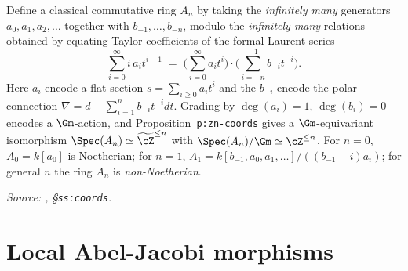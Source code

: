 \begin{definition}
  \label{def:An-coords}
  Define a classical commutative ring $A_n$ by taking the
  \emph{infinitely many} generators $a_0, a_1, a_2, \ldots$ together with
  $b_{-1}, \ldots, b_{-n}$, modulo the \emph{infinitely many} relations
  obtained by equating Taylor coefficients of the formal Laurent series
  \[
    \sum_{i=0}^{\infty} i\,a_i t^{i-1}
    \;=\;
    \Big(\sum_{i=0}^{\infty} a_i t^i\Big)\cdot
    \Big(\sum_{i=-n}^{-1} b_{-i} t^{-i}\Big).
  \]
  Here $a_i$ encode a flat section $s = \sum_{i\geq 0} a_i t^i$ and the
  $b_{-i}$ encode the polar connection $\nabla = d - \sum_{i=1}^n b_{-i}t^{-i}dt$.
  Grading by $\deg(a_i)=1$, $\deg(b_i)=0$ encodes a $\Gm$-action, and
  Proposition~\texttt{p:zn-coords} gives a $\Gm$-equivariant isomorphism
  $\Spec(A_n) \simeq \widetilde{\cZ}^{\leq n}$ with
  $\Spec(A_n)/\Gm \simeq \cZ^{\leq n}$. For $n=0$, $A_0 = k[a_0]$ is
  Noetherian; for $n=1$, $A_1 = k[b_{-1}, a_0, a_1, \ldots]/((b_{-1}-i)a_i)$;
  for general $n$ the ring $A_n$ is \emph{non-Noetherian}.

  \textit{Source: \cite{hilburn-raskin}, \S\texttt{ss:coords}.}
\end{definition}

\section{Local Abel-Jacobi morphisms}

